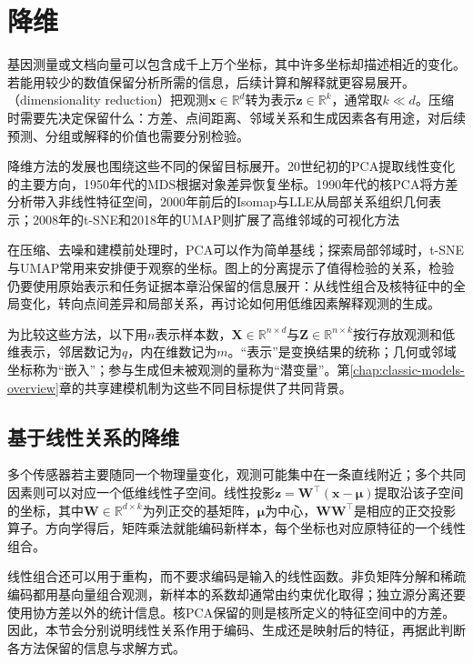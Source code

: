 \chapter{降维}
\label{chap:dimensionality-reduction}

基因测量或文档向量可以包含成千上万个坐标，其中许多坐标却描述相近的变化。若能用较少的数值保留分析所需的信息，后续计算和解释就更容易展开。（dimensionality reduction）把观测$\bm{x}\in\mathbb{R}^{d}$转为表示$\bm{z}\in\mathbb{R}^{k}$，通常取$k\ll d$。压缩时需要先决定保留什么：方差、点间距离、邻域关系和生成因素各有用途，对后续预测、分组或解释的价值也需要分别检验。

降维方法的发展也围绕这些不同的保留目标展开。20世纪初的PCA提取线性变化的主要方向，1950年代的MDS根据对象差异恢复坐标。1990年代的核PCA将方差分析带入非线性特征空间，2000年前后的Isomap与LLE从局部关系组织几何表示；2008年的t-SNE和2018年的UMAP则扩展了高维邻域的可视化方法

在压缩、去噪和建模前处理时，PCA可以作为简单基线；探索局部邻域时，t-SNE与UMAP常用来安排便于观察的坐标。图上的分离提示了值得检验的关系，检验仍要使用原始表示和任务证据本章沿保留的信息展开：从线性组合及核特征中的全局变化，转向点间差异和局部关系，再讨论如何用低维因素解释观测的生成。

为比较这些方法，以下用$n$表示样本数，$\bm{X}\in\mathbb{R}^{n\times d}$与$\bm{Z}\in\mathbb{R}^{n\times k}$按行存放观测和低维表示，邻居数记为$q$，内在维数记为$m$。“表示”是变换结果的统称；几何或邻域坐标称为“嵌入”；参与生成但未被观测的量称为“潜变量”。第\ref{chap:classic-models-overview}章的共享建模机制为这些不同目标提供了共同背景。

\section{基于线性关系的降维}
\label{sec:dim-linear}

多个传感器若主要随同一个物理量变化，观测可能集中在一条直线附近；多个共同因素则可以对应一个低维线性子空间。线性投影$\bm{z}=\bm{W}^{\top}(\bm{x}-\bm{\mu})$提取沿该子空间的坐标，其中$\bm{W}\in\mathbb{R}^{d\times k}$为列正交的基矩阵，$\bm{\mu}$为中心，$\bm{W}\bm{W}^{\top}$是相应的正交投影算子。方向学得后，矩阵乘法就能编码新样本，每个坐标也对应原特征的一个线性组合。

线性组合还可以用于重构，而不要求编码是输入的线性函数。非负矩阵分解和稀疏编码都用基向量组合观测，新样本的系数却通常由约束优化取得；独立源分离还要使用协方差以外的统计信息。核PCA保留的则是核所定义的特征空间中的方差。因此，本节会分别说明线性关系作用于编码、生成还是映射后的特征，再据此判断各方法保留的信息与求解方式。

